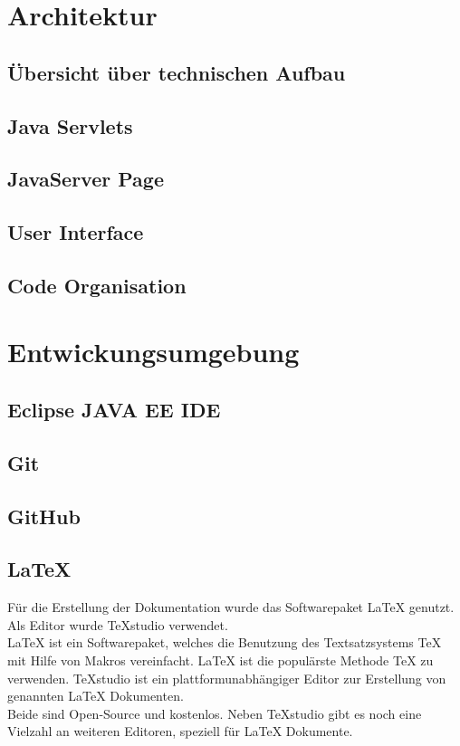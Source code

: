 \clearpage
\chapter{Architektur}
\section{Übersicht über technischen Aufbau}
\section{Java Servlets}
\section{JavaServer Page}
\section{User Interface}
\section{Code Organisation}

\chapter{Entwickungsumgebung}
\section{Eclipse JAVA EE IDE}
\section{Git}
\section{GitHub}
\section{LaTeX}
Für die Erstellung der Dokumentation wurde das Softwarepaket LaTeX genutzt. Als Editor wurde TeXstudio verwendet.\\
LaTeX ist ein Softwarepaket, welches die Benutzung des Textsatzsystems TeX mit Hilfe von Makros vereinfacht.
LaTeX ist die populärste Methode TeX zu verwenden.
TeXstudio ist ein plattformunabhängiger Editor zur Erstellung von genannten LaTeX Dokumenten.\\
Beide sind Open-Source und kostenlos. Neben TeXstudio gibt es noch eine Vielzahl an weiteren Editoren, speziell für LaTeX Dokumente. 

